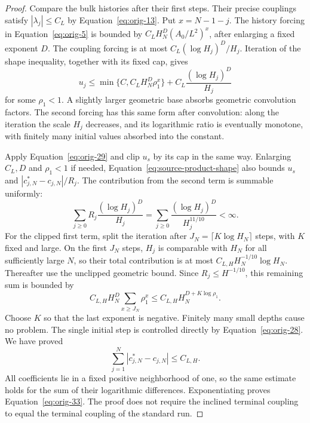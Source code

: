 \begin{proof}
Compare the bulk histories after their first steps.  Their
precise couplings satisfy $|\lambda_j|\le C_L$ by
Equation~\eqref{eq:orig-13}.  Put $x=N-1-j$.  The history
forcing in Equation~\eqref{eq:orig-5} is bounded by
$C_LH_N^D(A_0/L^2)^x$, after enlarging a fixed exponent $D$.
The coupling forcing is at most
$C_L(\log H_j)^D/H_j$.  Iteration of the shape inequality,
together with its fixed cap, gives
\begin{equation}
 u_j\le
 \min\{C,C_LH_N^D\rho_1^x\}
       +C_L\frac{(\log H_j)^D}{H_j}
 \label{eq:source-product-shape}
\end{equation}
for some $\rho_1<1$.  A slightly larger geometric base absorbs
geometric convolution factors.  The second forcing has this
same form after convolution: along the iteration the scale
$H_j$ decreases, and its logarithmic ratio is eventually
monotone, with finitely many initial values absorbed into the
constant.

Apply Equation~\eqref{eq:orig-29} and clip $u_s$ by its cap
in the same way.  Enlarging $C_L,D$ and $\rho_1<1$ if needed,
Equation~\eqref{eq:source-product-shape} also bounds $u_s$
and $|c_{j,N}^*-c_{j,N}|/R_j$.
The contribution from the second term is summable uniformly:
\[
 \sum_{j\ge0}R_j\frac{(\log H_j)^D}{H_j}
 =\sum_{j\ge0}\frac{(\log H_j)^D}{H_j^{11/10}}
 <\infty.
\]
For the clipped first term, split the iteration after
$J_N=\lceil K\log H_N\rceil$ steps, with $K$ fixed and large.
On the first $J_N$ steps, $H_j$ is comparable with $H_N$
for all sufficiently large $N$, so their total contribution
is at most $C_{L,H}H_N^{-1/10}\log H_N$.  Thereafter use
the unclipped geometric bound.  Since $R_j\le H^{-1/10}$,
this remaining sum is bounded by
\[
 C_{L,H}H_N^D\sum_{x\ge J_N}\rho_1^x
 \le C_{L,H}H_N^{D+K\log\rho_1}.
\]
Choose $K$ so that the last exponent is negative.  Finitely
many small depths cause no problem.  The single initial step
is controlled directly by Equation~\eqref{eq:orig-28}.
We have proved
\[
 \sum_{j=1}^N|c_{j,N}^*-c_{j,N}|\le C_{L,H}.
\]
All coefficients lie in a fixed positive neighborhood of one,
so the same estimate holds for the sum of their logarithmic
differences.  Exponentiating proves
Equation~\eqref{eq:orig-33}.  The proof does not require the
inclined terminal coupling to equal the terminal coupling
of the standard run.
\end{proof}
